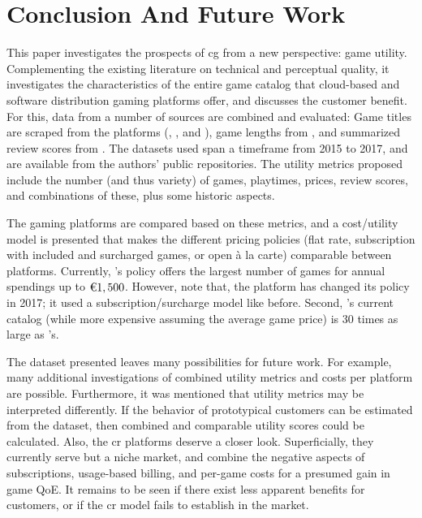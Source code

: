 \section{Conclusion And Future Work}
\label{sec:conclusion}

This paper investigates the prospects of \gls{cg} from a new
perspective: game utility. Complementing the existing literature
on technical and perceptual quality, it
investigates the characteristics of the entire game catalog
that cloud-based and software distribution gaming
platforms offer, and discusses the customer benefit.
For this, data from a number of sources are combined and evaluated:
Game titles are scraped from the platforms (\gfnow, \psnow, and \steam),
game lengths from \hltb, and summarized review scores from
\metacritic.
The datasets used span a timeframe from 2015 to 2017, and are
available from the authors' public repositories.
The utility metrics proposed include the number (and thus variety)
of games, playtimes, prices, review scores, and combinations of these,
plus some historic aspects.

The gaming platforms are compared based on these metrics, and a
cost/utility model is presented that makes the different pricing
policies (flat rate, subscription with included and surcharged
games, or open à la carte) comparable between platforms.
Currently, \psnow's policy offers the largest number of games
for annual spendings up to $\text{\texteuro} 1,500$. However,
note that, the platform has changed its policy
in 2017; it used a subscription/surcharge model like \gfnow
before. Second, \steam's current catalog (while more expensive
assuming the average game price) is 30 times as large as
\psnow's.

The dataset presented leaves many possibilities
for future work. For example, many additional investigations of
combined utility metrics and costs per platform are possible.
Furthermore, it was mentioned that utility metrics may be
interpreted differently. If the behavior of prototypical customers
can be estimated from the dataset, then combined and comparable
utility scores could be calculated.
Also, the \gls{cr} platforms deserve a closer look. Superficially,
they currently serve but a niche market, and combine the negative
aspects of subscriptions, usage-based billing, and per-game costs
for a presumed gain in game \gls{QoE}. It remains to be seen
if there exist less apparent benefits for customers, or if the
\gls{cr} model fails to establish in the market.

